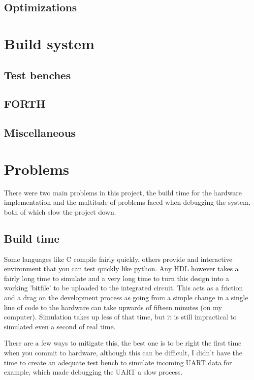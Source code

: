 \documentclass	[a4paper, 10pt]	{article}
\begin{document}
    \subsection{Optimizations}
  \section{Build system}
    \subsection{Test benches}
    \subsection{FORTH}
    \subsection{Miscellaneous}

  \section{Problems}

    There were two main problems in this project, the build time for the hardware
    implementation and the multitude of problems faced when debugging the system,
    both of which slow the project down.

    \subsection{Build time}

    Some languages like C compile fairly quickly, others provide and interactive
    environment that you can test quickly like python. Any HDL however takes
    a fairly long time to simulate and a very long time to turn this design into
    a working 'bitfile' to be uploaded to the integrated circuit. This acts as
    a friction and a drag on the development process as going from a simple change
    in a single line of code to the hardware can take upwards of fifteen minutes
    (on my computer). Simulation takes up less of that time, but it is still
    impractical to simulated even a second of real time. 

    There are a few ways
    to mitigate this, the best one is to be right the first time when you commit
    to hardware, although this can be difficult, I didn't have the time to create
    an adequate test bench to simulate incoming UART data for example, which made
    debugging the UART a slow process.
\end{document}
